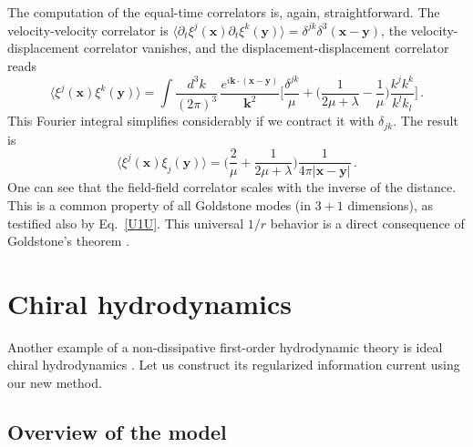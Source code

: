 \documentclass[a4paper, amsfonts, amssymb, amsmath, reprint, showkeys, nofootinbib, twoside,notitlepage,onecolumn,preprintnumbers]{revtex4-2}
\theoremstyle{definition}
\theoremstyle{theorem}
\theoremstyle{corollary}
\begin{document}
The computation of the equal-time correlators is, again, straightforward. The velocity-velocity correlator is $\langle \partial_t \xi^j(\textbf{x}) \partial_t \xi^k(\textbf{y}) \rangle=\delta^{jk}\delta^3(\textbf{x}-\textbf{y})$, the velocity-displacement correlator vanishes, and the displacement-displacement correlator reads
\begin{equation}
   \langle \xi^j(\textbf{x})  \xi^k(\textbf{y}) \rangle = \int \dfrac{d^3 k}{(2\pi)^3} \, \dfrac{e^{i\textbf{k}\cdot (\textbf{x}-\textbf{y})}}{\textbf{k}^2} \bigg[ \dfrac{\delta^{jk}}{\mu}  +\bigg( \dfrac{1}{2\mu +\lambda} -\dfrac{1}{\mu} \bigg) \dfrac{k^j k^k}{k^l k_l}  \bigg] \, .
\end{equation}
This Fourier integral simplifies considerably if we contract it with $\delta_{jk}$. The result is
\begin{equation}
     \langle \xi^j(\textbf{x})  \xi_j(\textbf{y}) \rangle = \bigg( \dfrac{2}{\mu}{+}\dfrac{1}{2\mu {+}\lambda} \bigg) \dfrac{1}{4\pi |\textbf{x}-\textbf{y}|} \, .
\end{equation}
One can see that the field-field correlator scales with the inverse of the distance. This is a common property of all Goldstone modes (in $3{+}1$ dimensions), as testified also by Eq.\ \eqref{U1U}. This universal $1/r$ behavior is a direct consequence of Goldstone's theorem \cite{huang_book,Zee2003}.


\section{Chiral hydrodynamics}\label{CHIRUZ}

Another example of a non-dissipative first-order hydrodynamic theory is ideal chiral hydrodynamics 
\cite{Erdmenger:2008rm, Banerjee:2008th, Son:2009tf,Sadofyev:2010pr,Neiman:2010zi,Landsteiner:2012kd,Chen:2015gta,Speranza2021}. Let us construct its regularized information current using our new method.

\subsection{Overview of the model}\label{overv}
\end{document}
